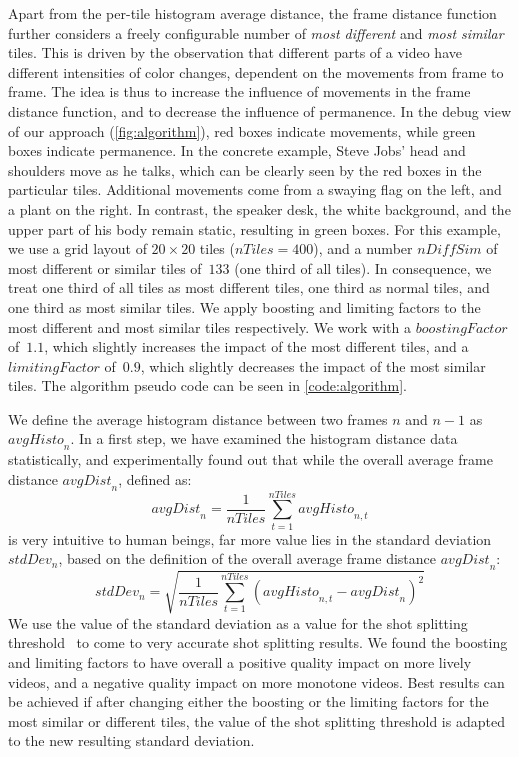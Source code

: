 \documentclass{acm_proc_article-sp}
\begin{document}
Apart from the per-tile histogram average distance, the frame distance function further considers a freely configurable number of \emph{most different} and \emph{most similar} tiles. This is driven by the observation that different parts of a video have different intensities of color changes, dependent on the movements from frame to frame. The idea is thus to increase the influence of movements in the frame distance function, and to decrease the influence of permanence. In the debug view of our approach (\autoref{fig:algorithm}), red boxes indicate movements, while green boxes indicate permanence. In the concrete example, Steve Jobs' head and shoulders move as he talks, which can be clearly seen by the red boxes in the particular tiles. Additional movements come from a swaying flag on the left, and a plant on the right. In contrast, the speaker desk, the white background, and the upper part of his body remain static, resulting in green boxes. For this example, we use a grid layout of $\mathit{20} \times \mathit{20}$ tiles ($\mathit{nTiles} = 400$), and a number $\mathit{nDiffSim}$ of most different or similar tiles of~$\mathit{133}$ (one third of all tiles). In consequence, we treat one third of all tiles as most different tiles, one third as normal tiles, and one third as most similar tiles. We apply boosting and limiting factors to the most different and most similar tiles respectively. We work with a $\mathit{boostingFactor}$ of~$\mathit{1.1}$, which slightly increases the impact of the most different tiles, and a $\mathit{limitingFactor}$ of~$\mathit{0.9}$, which slightly decreases the impact of the most similar tiles. The algorithm pseudo code can be seen in \autoref{code:algorithm}.

We define the average histogram distance between two frames $\mathit{n}$ and $\mathit{n - 1}$ as $\mathit{avgHisto}_{n}$. In a first step, we have examined the histogram distance data statistically, and experimentally found out that while the overall average frame distance $\mathit{avgDist}_{n}$, defined as: $$\mathit{avgDist}_{n} = \frac{1}{\mathit{nTiles}}\sum_{t=1}^{\mathit{nTiles}}\mathit{avgHisto}_{n, t}$$ is very intuitive to human beings, far more value lies in the standard deviation $\mathit{stdDev}_{n}$, based on the definition of the overall average frame distance $\mathit{avgDist}_{n}$: $$\mathit{stdDev}_{n} = \sqrt{\frac{1}{\mathit{nTiles}}\sum_{t=1}^{\mathit{nTiles}}(\mathit{avgHisto}_{n, t} - \mathit{avgDist}_{n})^{2}}$$ We use the value of the standard deviation as a value for the shot splitting threshold~\cite{Lienhart1999} to come to very accurate shot splitting results. We found the boosting and limiting factors to have overall a positive quality impact on more lively videos, and a negative quality impact on more monotone videos. Best results can be achieved if after changing either the boosting or the limiting factors for the most similar or different tiles, the value of the shot splitting threshold is adapted to the new resulting standard deviation. %
\end{document}
